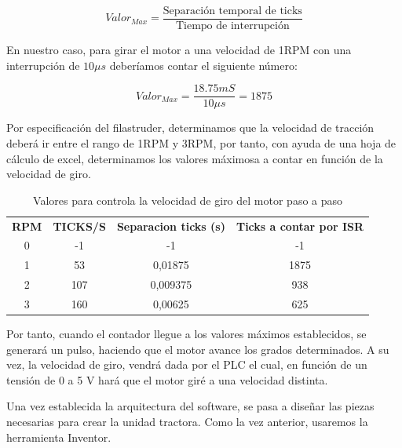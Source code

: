 $$ Valor_{Max} = \frac{\text{Separación temporal de ticks}}{\text{Tiempo de interrupción}}$$

En nuestro caso, para girar el motor a una velocidad de 1RPM con una interrupción de $10\mu s$ deberíamos contar el siguiente número:

$$Valor_{Max} = \frac{18.75 mS}{10\mu s} = 1875$$

Por especificación del filastruder, determinamos que la velocidad de tracción deberá ir entre el rango de 1RPM y 3RPM, por tanto, con ayuda de una hoja de cálculo de excel, determinamos los valores máximosa a contar en función de la velocidad de giro.

\begin{table}[H]
\centering
\begin{tabular}{cccc}
\multicolumn{1}{l}{{\bf RPM}} & \multicolumn{1}{l}{{\bf TICKS/S}} & \multicolumn{1}{l}{{\bf Separacion ticks (s)}} & \multicolumn{1}{l}{{\bf Ticks a contar por ISR}} \\
0 & -1 & -1 & -1 \\
1 & 53 & 0,01875 & 1875 \\
2 & 107 & 0,009375 & 938 \\
3 & 160 & 0,00625 & 625
\end{tabular}
\caption{Valores para controla la velocidad de giro del motor paso a paso}
\label{tab:valores_paso_paso}
\end{table}

Por tanto, cuando el contador llegue a los valores máximos establecidos, se generará un pulso, haciendo que el motor avance los grados determinados. A su vez, la velocidad de giro, vendrá dada por el PLC el cual, en función de un tensión de 0 a 5 V hará que el motor giré a una velocidad distinta.

Una vez establecida la arquitectura del software, se pasa a diseñar las piezas necesarias para crear la unidad tractora. Como la vez anterior, usaremos la herramienta Inventor.